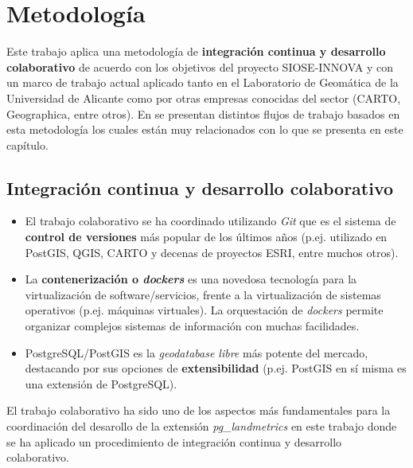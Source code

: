 

\chapter{Metodología}\label{chap:metod}

Este trabajo aplica una metodología de \textbf{integración continua y desarrollo colaborativo} de acuerdo con los objetivos del proyecto SIOSE-INNOVA y con un marco de trabajo actual aplicado tanto en el Laboratorio de Geomática de la Universidad de Alicante como por otras empresas conocidas del sector (CARTO, Geographica, entre otros). En \citet{Zaragozi2017} se presentan distintos flujos de trabajo basados en esta metodología los cuales están muy relacionados con lo que se presenta en este capítulo.


\section{Integración continua y desarrollo colaborativo}

\begin{graybox}
\begin{itemize}
\item El trabajo colaborativo se ha coordinado utilizando \textit{Git} que es el sistema de \textbf{control de versiones} más popular de los últimos años (p.ej. utilizado en PostGIS, QGIS, CARTO y decenas de proyectos ESRI, entre muchos otros).
\item La \textbf{contenerización o \textit{dockers}} es una novedosa tecnología para la virtualización de software/servicios, frente a la virtualización de sistemas operativos (p.ej. máquinas virtuales). La orquestación de \textit{dockers} permite organizar complejos sistemas de información con muchas facilidades.
\item PostgreSQL/PostGIS es la \textit{geodatabase libre} más potente del mercado, destacando por sus opciones de \textbf{extensibilidad} (p.ej. PostGIS en sí misma es una extensión de PostgreSQL).
\end{itemize}
\end{graybox}

El trabajo colaborativo ha sido uno de los aspectos más fundamentales para la coordinación del desarollo de la extensión \textit{pg\_landmetrics} en este trabajo donde se ha aplicado un procedimiento de integración continua y desarrollo colaborativo.

